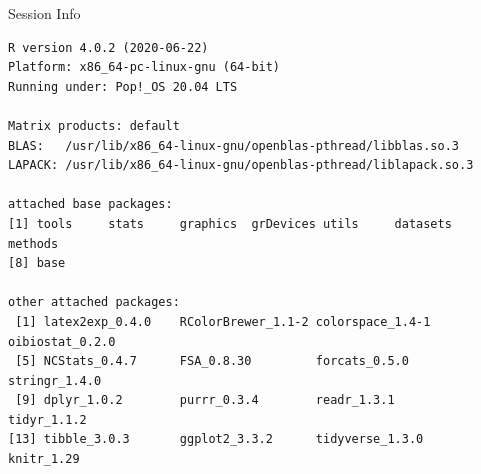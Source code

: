 \documentclass[10pt,handout]{beamer}\usepackage[]{graphicx}\usepackage[]{color}
\makeatletter
\newenvironment{kframe}{%
 \def\at@end@of@kframe{}%
 \ifinner\ifhmode%
  \def\at@end@of@kframe{\end{minipage}}%
  \begin{minipage}{\columnwidth}%
 \fi\fi%
 \def\FrameCommand##1{\hskip\@totalleftmargin \hskip-\fboxsep
 \colorbox{shadecolor}{##1}\hskip-\fboxsep
     \hskip-\linewidth \hskip-\@totalleftmargin \hskip\columnwidth}%
 \MakeFramed {\advance\hsize-\width
   \@totalleftmargin\z@ \linewidth\hsize
   \@setminipage}}%
 {\par\unskip\endMakeFramed%
 \at@end@of@kframe}
\newenvironment{knitrout}{}{} %
\makeatother
\begin{document}
\begin{frame}[fragile]{Session Info}
	\tiny
	
\begin{knitrout}\tiny
{}\color{fgcolor}\begin{kframe}
\begin{verbatim}
R version 4.0.2 (2020-06-22)
Platform: x86_64-pc-linux-gnu (64-bit)
Running under: Pop!_OS 20.04 LTS

Matrix products: default
BLAS:   /usr/lib/x86_64-linux-gnu/openblas-pthread/libblas.so.3
LAPACK: /usr/lib/x86_64-linux-gnu/openblas-pthread/liblapack.so.3

attached base packages:
[1] tools     stats     graphics  grDevices utils     datasets  methods  
[8] base     

other attached packages:
 [1] latex2exp_0.4.0    RColorBrewer_1.1-2 colorspace_1.4-1   oibiostat_0.2.0   
 [5] NCStats_0.4.7      FSA_0.8.30         forcats_0.5.0      stringr_1.4.0     
 [9] dplyr_1.0.2        purrr_0.3.4        readr_1.3.1        tidyr_1.1.2       
[13] tibble_3.0.3       ggplot2_3.3.2      tidyverse_1.3.0    knitr_1.29        


\end{verbatim}
\end{kframe}
\end{knitrout}
\end{frame}
\end{document}
